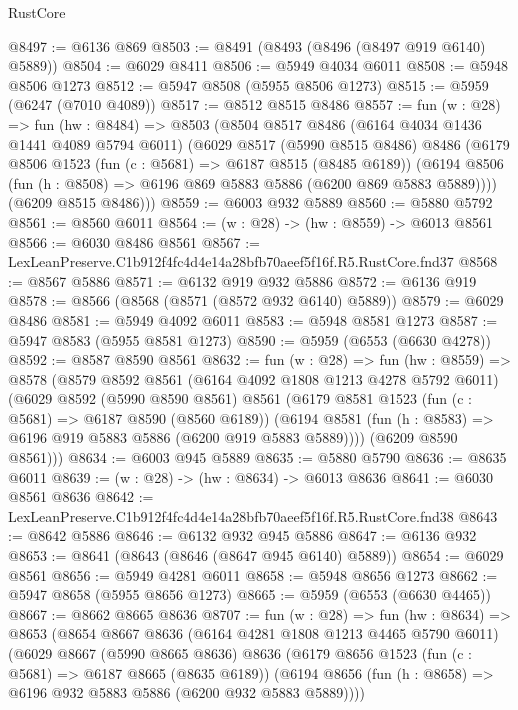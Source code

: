 \begin{lexlean}{RustCore}
\begin{coremodule}
@8497 := @6136 @869
@8503 := @8491 (@8493 (@8496 (@8497 @919 @6140) @5889))
@8504 := @6029 @8411
@8506 := @5949 @4034 @6011
@8508 := @5948 @8506 @1273
@8512 := @5947 @8508 (@5955 @8506 @1273)
@8515 := @5959 (@6247 (@7010 @4089))
@8517 := @8512 @8515 @8486
@8557 := fun (w : @28) =>
  fun (hw : @8484) =>
  @8503
    (@8504
      @8517
      @8486
      (@6164 @4034 @1436 @1441 @4089 @5794 @6011)
      (@6029
        @8517
        (@5990 @8515 @8486)
        @8486
        (@6179
          @8506
          @1523
          (fun (c : @5681) => @6187 @8515 (@8485 @6189))
          (@6194 @8506 (fun (h : @8508) => @6196 @869 @5883 @5886 (@6200 @869 @5883 @5889))))
        (@6209 @8515 @8486)))
@8559 := @6003 @932 @5889
@8560 := @5880 @5792
@8561 := @8560 @6011
@8564 := (w : @28) -> (hw : @8559) -> @6013 @8561
@8566 := @6030 @8486 @8561
@8567 := LexLeanPreserve.C1b912f4fc4d4e14a28bfb70aeef5f16f.R5.RustCore.fnd37
@8568 := @8567 @5886
@8571 := @6132 @919 @932 @5886
@8572 := @6136 @919
@8578 := @8566 (@8568 (@8571 (@8572 @932 @6140) @5889))
@8579 := @6029 @8486
@8581 := @5949 @4092 @6011
@8583 := @5948 @8581 @1273
@8587 := @5947 @8583 (@5955 @8581 @1273)
@8590 := @5959 (@6553 (@6630 @4278))
@8592 := @8587 @8590 @8561
@8632 := fun (w : @28) =>
  fun (hw : @8559) =>
  @8578
    (@8579
      @8592
      @8561
      (@6164 @4092 @1808 @1213 @4278 @5792 @6011)
      (@6029
        @8592
        (@5990 @8590 @8561)
        @8561
        (@6179
          @8581
          @1523
          (fun (c : @5681) => @6187 @8590 (@8560 @6189))
          (@6194 @8581 (fun (h : @8583) => @6196 @919 @5883 @5886 (@6200 @919 @5883 @5889))))
        (@6209 @8590 @8561)))
@8634 := @6003 @945 @5889
@8635 := @5880 @5790
@8636 := @8635 @6011
@8639 := (w : @28) -> (hw : @8634) -> @6013 @8636
@8641 := @6030 @8561 @8636
@8642 := LexLeanPreserve.C1b912f4fc4d4e14a28bfb70aeef5f16f.R5.RustCore.fnd38
@8643 := @8642 @5886
@8646 := @6132 @932 @945 @5886
@8647 := @6136 @932
@8653 := @8641 (@8643 (@8646 (@8647 @945 @6140) @5889))
@8654 := @6029 @8561
@8656 := @5949 @4281 @6011
@8658 := @5948 @8656 @1273
@8662 := @5947 @8658 (@5955 @8656 @1273)
@8665 := @5959 (@6553 (@6630 @4465))
@8667 := @8662 @8665 @8636
@8707 := fun (w : @28) =>
  fun (hw : @8634) =>
  @8653
    (@8654
      @8667
      @8636
      (@6164 @4281 @1808 @1213 @4465 @5790 @6011)
      (@6029
        @8667
        (@5990 @8665 @8636)
        @8636
        (@6179
          @8656
          @1523
          (fun (c : @5681) => @6187 @8665 (@8635 @6189))
          (@6194 @8656 (fun (h : @8658) => @6196 @932 @5883 @5886 (@6200 @932 @5883 @5889))))

\end{coremodule}
\end{lexlean}
